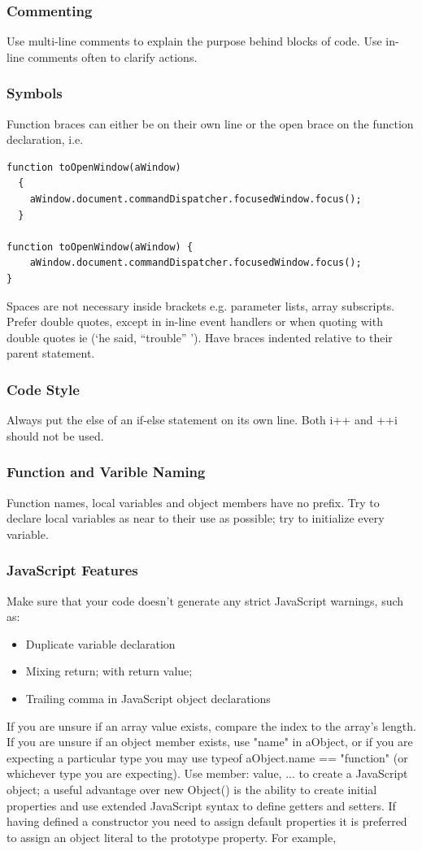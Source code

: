 \documentclass[letterpaper,12pt]{article}
\begin{document}
\subsubsection{Commenting}
Use multi-line comments to explain the purpose behind blocks of code.
Use in-line comments often to clarify actions.

\subsubsection{Symbols}
Function braces can either be on their own line or the open brace on the function declaration, i.e.

\begin{verbatim}
function toOpenWindow(aWindow)
  {
    aWindow.document.commandDispatcher.focusedWindow.focus();  
  }

function toOpenWindow(aWindow) {
    aWindow.document.commandDispatcher.focusedWindow.focus();  
}
\end{verbatim}
Spaces are not necessary inside brackets e.g. parameter lists, array subscripts.
Prefer double quotes, except in in-line event handlers or when quoting with double quotes ie (‘he said, “trouble” ’).
Have braces indented relative to their parent statement.
\subsubsection{Code Style}
Always put the else of an if-else statement on its own line.
Both i++ and ++i should not be used.
\subsubsection{Function and Varible Naming}
Function names, local variables and object members have no prefix.
Try to declare local variables as near to their use as possible; try to initialize every variable.

\subsubsection{JavaScript Features}
Make sure that your code doesn't generate any strict JavaScript warnings, such as:
\begin{itemize}
      	  \item{Duplicate variable declaration}
      	  \item{Mixing return; with return value;}
      	  \item{Trailing comma in JavaScript object declarations}
\end{itemize}    	
If you are unsure if an array value exists, compare the index to the array's length. If you are unsure if an object member exists, use "name" in aObject, or if you are expecting a particular type you may use typeof aObject.name == "function" (or whichever type you are expecting).
Use { member: value, ... } to create a JavaScript object; a useful advantage over new Object() is the ability to create initial properties and use extended JavaScript syntax to define getters and setters.  If having defined a constructor you need to assign default properties it is preferred to assign an object literal to the prototype property. For example,
\end{document}
